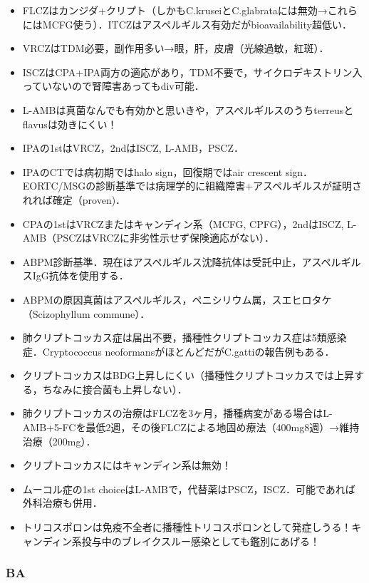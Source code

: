 \begin{itemize}
\item FLCZはカンジダ+クリプト（しかもC.kruseiとC.glabrataには無効→これらにはMCFG使う）．ITCZはアスペルギルス有効だがbioavailability超低い．
\item VRCZはTDM必要，副作用多い→眼，肝，皮膚（光線過敏，紅斑）．
\item ISCZはCPA+IPA両方の適応があり，TDM不要で，サイクロデキストリン入っていないので腎障害あってもdiv可能．
\item L-AMBは真菌なんでも有効かと思いきや，アスペルギルスのうちterreusとflavusは効きにくい！
\item IPAの1stはVRCZ，2ndはISCZ, L-AMB，PSCZ．
\item IPAのCTでは病初期ではhalo sign，回復期ではair crescent sign．EORTC/MSGの診断基準では病理学的に組織障害+アスペルギルスが証明されれば確定（proven)．
\item CPAの1stはVRCZまたはキャンディン系（MCFG, CPFG），2ndはISCZ, L-AMB（PSCZはVRCZに非劣性示せず保険適応がない）．

\item ABPM診断基準．現在はアスペルギルス沈降抗体は受託中止，アスペルギルスIgG抗体を使用する．


\item ABPMの原因真菌はアスペルギルス，ペニシリウム属，スエヒロタケ（Scizophyllum commune）．

\item 肺クリプトコッカス症は届出不要，播種性クリプトコッカス症は5類感染症．Cryptococcus neoformansがほとんどだがC.gattiの報告例もある．
\item クリプトコッカスはBDG上昇しにくい（播種性クリプトコッカスでは上昇する，ちなみに接合菌も上昇しない）．
\item 肺クリプトコッカスの治療はFLCZを3ヶ月，播種病変がある場合はL-AMB+5-FCを最低2週，その後FLCZによる地固め療法（400mg8週）→維持治療（200mg）．
\item クリプトコッカスにはキャンディン系は無効！
\item ムーコル症の1st choiceはL-AMBで，代替薬はPSCZ，ISCZ．可能であれば外科治療も併用．
\item トリコスポロンは免疫不全者に播種性トリコスポロンとして発症しうる！キャンディン系投与中のブレイクスルー感染としても鑑別にあげる！
\end{itemize}


\subsubsection{BA}

